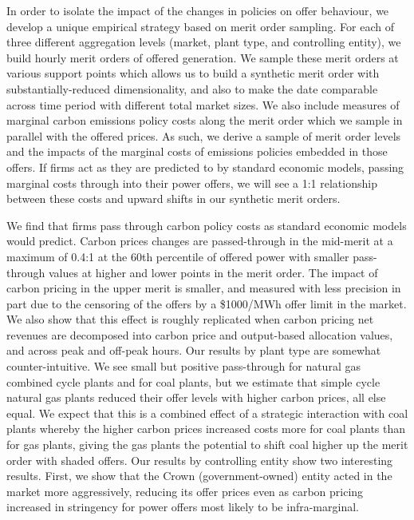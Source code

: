 \documentclass[12pt]{article}
\begin{document}
In order to isolate the impact of the changes in policies on offer behaviour, we develop a unique empirical strategy based on merit order sampling. For each of three different aggregation levels (market, plant type, and controlling entity), we build hourly merit orders of offered generation. We sample these merit orders at various support points which allows us to build a synthetic merit order with substantially-reduced dimensionality, and also to make the date comparable across time period with different total market sizes. We also include measures of marginal carbon emissions policy costs along the merit order which we sample in parallel with the offered prices. As such, we derive a sample of merit order levels and the impacts of the marginal costs of emissions policies embedded in those offers. If firms act as they are predicted to by standard economic models, passing marginal costs through into their power offers, we will see a 1:1 relationship between these costs and upward shifts in our synthetic merit orders.

We find that firms pass through carbon policy costs as standard economic models would predict. Carbon prices changes are passed-through in the mid-merit at a maximum of 0.4:1 at the 60th percentile of offered power with smaller pass-through values at higher and lower points in the merit order. The impact of carbon pricing in the upper merit is smaller, and measured with less precision in part due to the censoring of the offers by a \$1000/MWh offer limit in the market. We also show that this effect is roughly replicated when carbon pricing net revenues are decomposed into carbon price and output-based allocation values, and across peak and off-peak hours. Our results by plant type are somewhat counter-intuitive. We see small but positive pass-through for natural gas combined cycle plants and for coal plants, but we estimate that simple cycle natural gas plants reduced their offer levels with higher carbon prices, all else equal. We expect that this is a combined effect of a strategic interaction with coal plants whereby the higher carbon prices increased costs more for coal plants than for gas plants, giving the gas plants the potential to shift coal higher up the merit order with shaded offers. Our results by controlling entity show two interesting results. First, we show that the Crown (government-owned) entity acted in the market more aggressively, reducing its offer prices even as carbon pricing increased in stringency for power offers most likely to be infra-marginal.
\end{document}
